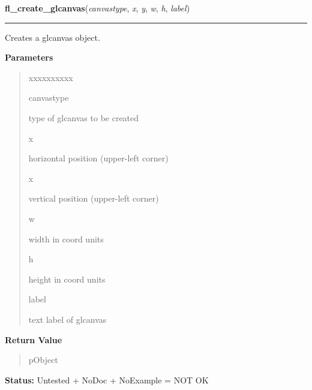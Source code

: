 \hspace{.8\funcindent}\begin{boxedminipage}{\funcwidth}

    \raggedright \textbf{fl\_create\_glcanvas}(\textit{canvastype}, \textit{x}, \textit{y}, \textit{w}, \textit{h}, \textit{label})

    \vspace{-1.5ex}

    \rule{\textwidth}{0.5\fboxrule}
\setlength{\parskip}{2ex}
    Creates a glcanvas object.

\setlength{\parskip}{1ex}
      \textbf{Parameters}
      \vspace{-1ex}

      \begin{quote}
        \begin{Ventry}{xxxxxxxxxx}

          \item[canvastype]

          type of glcanvas to be created

          \item[x]

          horizontal position (upper-left corner)

          \item[x]

          vertical position (upper-left corner)

          \item[w]

          width in coord units

          \item[h]

          height in coord units

          \item[label]

          text label of glcanvas

        \end{Ventry}

      \end{quote}

      \textbf{Return Value}
    \vspace{-1ex}

      \begin{quote}
      pObject

      \end{quote}

\textbf{Status:} Untested + NoDoc + NoExample = NOT OK



    \end{boxedminipage}

